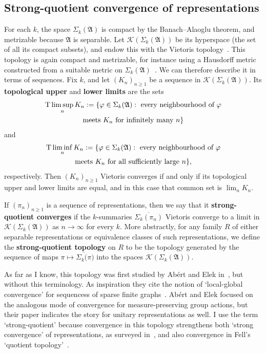 \documentclass[12pt,a4paper]{article}
\numberwithin{equation}{section}
\theoremstyle{remark}
\renewcommand{\rm}[1]{\mathrm{#1}}
\renewcommand{\cal}[1]{\mathcal{#1}}
\newcommand{\A}{\mathfrak{A}}
\renewcommand{\S}{\Sigma}
\renewcommand{\phi}{\varphi}
\newcommand{\ol}[1]{\overline{#1}}
\begin{document}
\subsection{Strong-quotient convergence of representations}\label{subs:strong-quotient}

For each $k$, the space $\S_k(\A)$ is compact by the Banach--Alaoglu theorem, and metrizable because $\A$ is separable.  Let $\cal{K}(\S_k(\A))$ be its hyperspace (the set of all its compact subsets), and endow this with the Vietoris topology~\cite[Subsec. I.4.F]{Kec95}.  This topology is again compact and metrizable, for instance using a Hausdorff metric constructed from a suitable metric on $\S_k(\A)$~\cite[Thm. 4.26]{Kec95}.  We can therefore describe it in terms of sequences.  Fix $k$, and let $(K_n)_{n\ge 1}$ be a sequence in $\cal{K}(\S_k(\A))$. Its \textbf{topological upper} and \textbf{lower limits} are the sets
\begin{multline*}
\rm{T}\limsup_n K_n := \{\phi \in \S_k(\A):\ \hbox{every neighbourhood of $\phi$}\\ \hbox{meets $K_n$ for infinitely many $n$}\}
\end{multline*}
and
\begin{multline*}
\rm{T}\liminf_n K_n := \{\phi \in \S_k(\A):\ \hbox{every neighbourhood of $\phi$}\\ \hbox{meets $K_n$ for all sufficiently large $n$}\},
\end{multline*}
respectively.  Then $(K_n)_{n\ge 1}$ Vietoris converges if and only if its topological upper and lower limits are equal, and in this case that common set is $\lim_n K_n$.

If $(\pi_n)_{n\ge 1}$ is a sequence of representations, then we say that it \textbf{strong-quotient converges} if the $k$-summaries $\ol{\S_k(\pi_n)}$ Vietoris converge to a limit in $\cal{K}(\S_k(\A))$ as $n\to\infty$ for every $k$.  More abstractly, for any family $R$ of either separable representations or equivalence classes of such representations, we define the \textbf{strong-quotient topology} on $R$ to be the topology generated by the sequence of maps $\pi \mapsto \ol{\S_k(\pi})$ into the spaces $\cal{K}(\S_k(\A))$.

As far as I know, this topology was first studied by Ab\'ert and Elek in~\cite{AbeEle11}, but without this terminology.  As inspiration they cite the notion of `local-global convergence' for sequencess of sparse finite graphs~\cite{BolRio11,HatamiLovSze14}.  Ab\'ert and Elek focused on the analogous mode of convergence for measure-preserving group actions, but their paper indicates the story for unitary representations as well.  I use the term `strong-quotient' because convergence in this topology strengthens both `strong convergence' of representations, as surveyed in~\cite{Magee--survey}, and also convergence in Fell's `quotient topology'~\cite[Sec. 3]{Fel60b}.
\end{document}
